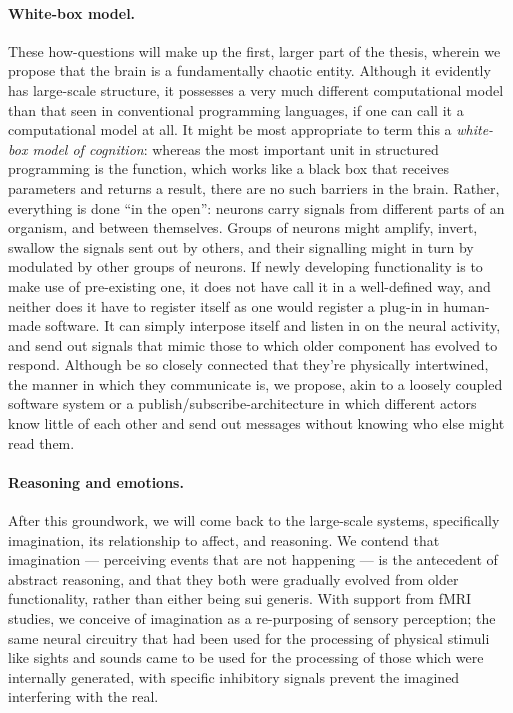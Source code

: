 \paragraph{White-box model.} These how-questions will make up the first, larger part of the thesis, wherein we propose that the brain is a fundamentally chaotic entity. Although it evidently has large-scale structure, it possesses a very much different computational model than that seen in conventional programming languages, if one can call it a computational model at all. It might be most appropriate to term this a {\em white-box model of cognition}: whereas the most important unit in structured programming is the function, which works like a black box that receives parameters and returns a result, there are no such barriers in the brain. Rather, everything is done ``in the open'': neurons carry signals from different parts of an organism, and between themselves. Groups of neurons might amplify, invert, swallow the signals sent out by others, and their signalling might in turn by modulated by other groups of neurons. If newly developing functionality is to make use of pre-existing one, it does not have call it in a well-defined way, and neither does it have to register itself as one would register a plug-in in human-made software. It can simply interpose itself and listen in on the neural activity, and send out signals that mimic those to which older component has evolved to respond. Although be so closely connected that they're physically intertwined, the manner in which they communicate is, we propose, akin to a loosely coupled software system or a publish/subscribe-architecture in which different actors know little of each other and send out messages without knowing who else might read them.

\paragraph{Reasoning and emotions.} After this groundwork, we will come back to the large-scale systems, specifically imagination, its relationship to affect, and reasoning. We contend that imagination --- perceiving events that are not happening --- is the antecedent of abstract reasoning, and that they both were gradually evolved from older functionality, rather than either being sui generis. With support from fMRI studies, we conceive of imagination as a re-purposing of sensory perception; the same neural circuitry that had been used for the processing of physical stimuli like sights and sounds came to be used for the processing of those which were internally generated, with specific inhibitory signals prevent the imagined interfering with the real.

